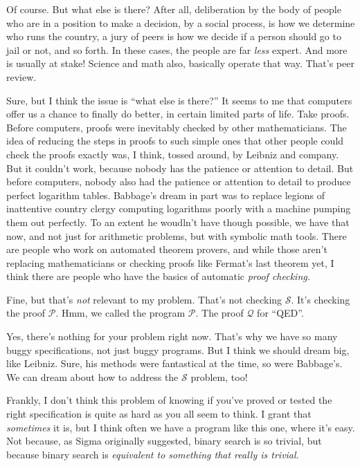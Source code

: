 \documentclass[sigplan]{acmart}
\begin{document}
 Of course.  But what else is there?  After
all, deliberation by the body of people who are in a position to make
a decision, by a social process, is how we determine who runs the country, a jury
of peers is how we decide if a person should go to jail or not, and so
forth.  In these cases, the people are far \emph{less} expert.  And
more is usually at stake!  Science and math also, basically operate
that way.  That's peer review.

  Sure, but I think the issue is ``what
else is there?''  It seems to me that computers offer us a chance to
finally do better, in certain limited parts of life.  Take proofs.
Before computers, proofs were inevitably checked by other
mathematicians.  The idea of reducing the steps in proofs to such
simple ones that other people could check the proofs exactly was, I
think, tossed around, by Leibniz and company.  But it couldn't work,
because nobody has the patience or attention to detail.  But before
computers, nobody also had the patience or attention to detail to
produce perfect logarithm tables.  Babbage's dream in part was to
replace legions of inattentive country clergy computing logarithms
poorly with a machine pumping them out perfectly.  To an extent he
woudln't have though possible, we have that now, and not just for
arithmetic problems, but with symbolic math tools.  There are people
who work on automated theorem provers, and while those aren't
replacing mathematicians or checking proofs like Fermat's last theorem
yet, I think there are people who have the basics of automatic
\emph{proof checking.}

   Fine, but that's \emph{not} relevant to
my problem.  That's not checking $\mathcal{S}$.  It's checking the
proof $\mathcal{P}$.  Hmm, we called the program $\mathcal{P}$.  The
proof $\mathcal{Q}$ for ``QED''.

  Yes, there's nothing for your problem
right now.  That's why we have so many buggy specifications, not just
buggy programs.  But I think we should dream big, like Leibniz.  Sure,
his methods were fantastical at the time, so were Babbage's.  We can
dream about how to address the $\mathcal{S}$ problem, too!


 Frankly, I don't think this problem of knowing if
you've proved or tested the right specification is quite as hard as
you all seem to think. I grant that \emph{sometimes} it is, but I
think often we have a program like this one, where it's easy.  Not
because, as Sigma originally suggested, binary search is so trivial,
but because binary search is \emph{equivalent to something that really
  is trivial.}
\end{document}
